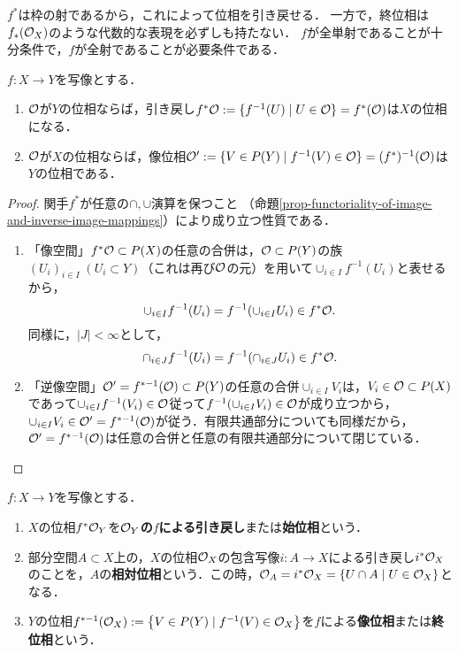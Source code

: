 \documentclass[uplatex,dvipdfmx]{jsreport}
\begin{document}
\begin{tcolorbox}[colframe=ForestGreen, colback=ForestGreen!10!white,breakable,colbacktitle=ForestGreen!40!white,coltitle=black,fonttitle=\bfseries\sffamily,
title=]
    $f^*$は枠の射であるから，これによって位相を引き戻せる．
    一方で，終位相は$f_*(\mathcal{O}_X)$のような代数的な表現を必ずしも持たない．
    $f$が全単射であることが十分条件で，$f$が全射であることが必要条件である．
\end{tcolorbox}

\begin{proposition}[$f^*$は枠の射である]\label{prop-pullback-and-image-topology}
    $f:X\to Y$を写像とする．
    \begin{enumerate}
        \item $\mathcal{O}$が$Y$の位相ならば，引き戻し$f^*\mathcal{O}:=\{f^{-1}(U)\mid U\in\mathcal{O}\}=f^*(\mathcal{O})$は$X$の位相になる．
        \item $\mathcal{O}$が$X$の位相ならば，像位相$\mathcal{O}':=\{V\in P(Y)\mid  f^{-1}(V)\in\mathcal{O}\}=(f^*)^{-1}(\mathcal{O})$は$Y$の位相である．
    \end{enumerate}
\end{proposition}
\begin{proof}
    関手$f^*$が任意の$\cap,\cup$演算を保つこと
    （命題\ref{prop-functoriality-of-image-and-inverse-image-mappings}）により成り立つ性質である．
    \begin{enumerate}
        \item 「像空間」$f^*\mathcal{O}\subset P(X)$の任意の合併は，$\mathcal{O}\subset P(Y)$の族$(U_i)_{i\in I}\;(U_i\subset Y)$（これは再び$\mathcal{O}$の元）を用いて$\cup_{i\in I}f^{-1}(U_i)$と表せるから，\[\cup_{i\in I}f^{-1}(U_i)=f^{-1}(\cup_{i\in I}U_i)\in f^*\mathcal{O}.\]同様に，$|J|<\infty$として，\[\cap_{i\in J}f^{-1}(U_i)=f^{-1}(\cap_{i\in J}U_i)\in f^*\mathcal{O}.\]
        \item 「逆像空間」$\mathcal{O}'=f^{*-1}(\mathcal{O})\subset P(Y)$の任意の合併$\cup_{i\in I}V_i$は，$V_i\in\mathcal{O}\subset P(X)$であって$\cup_{i\in I}f^{-1}(V_i)\in \mathcal{O}$従って$f^{-1}(\cup_{i\in I}V_i)\in\mathcal{O}$が成り立つから，$\cup_{i\in I}V_i\in\mathcal{O}'=f^{*-1}(\mathcal{O})$が従う．有限共通部分についても同様だから，$\mathcal{O}'=f^{*-1}(\mathcal{O})$は任意の合併と任意の有限共通部分について閉じている．
    \end{enumerate}
\end{proof}

\begin{definition}
    $f:X\to Y$を写像とする．
    \begin{enumerate}
        \item $X$の位相$f^*\mathcal{O}_Y$を\textbf{$\mathcal{O}_Y$の$f$による引き戻し}または\textbf{始位相}という．
        \item 部分空間$A\subset X$上の，$X$の位相$\mathcal{O}_X$の包含写像$i:A\to X$による引き戻し$i^*\mathcal{O}_X$のことを，$A$の\textbf{相対位相}という．この時，$\mathcal{O}_A=i^*\mathcal{O}_X=\{U\cap A\mid U\in\mathcal{O}_X\}$となる．
        \item $Y$の位相$f^{*-1}(\mathcal{O}_X):=\left\{V\in P(Y)\mid f^{-1}(V)\in\mathcal{O}_X\right\}$を$f$による\textbf{像位相}または\textbf{終位相}という．
    \end{enumerate}
\end{definition}
\end{document}
